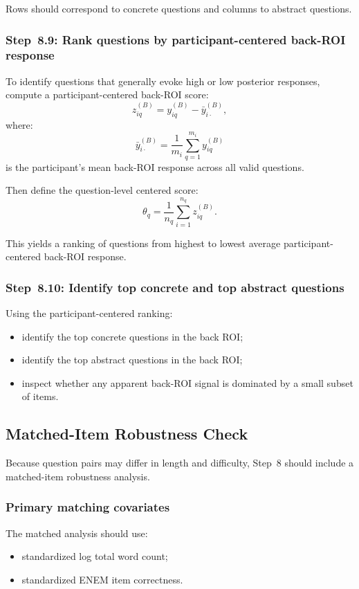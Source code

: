 Rows should correspond to concrete questions and columns to abstract questions.

\subsubsection{Step~8.9: Rank questions by participant-centered back-ROI response}
To identify questions that generally evoke high or low posterior responses,
compute a participant-centered back-ROI score:
\begin{equation}
z^{(B)}_{iq}
=
y^{(B)}_{iq}
-
\bar{y}^{(B)}_{i\cdot},
\end{equation}
where:
\begin{equation}
\bar{y}^{(B)}_{i\cdot}
=
\frac{1}{m_i}
\sum_{q=1}^{m_i} y^{(B)}_{iq}
\end{equation}
is the participant's mean back-ROI response across all valid questions.

Then define the question-level centered score:
\begin{equation}
\theta_q
=
\frac{1}{n_q}
\sum_{i=1}^{n_q} z^{(B)}_{iq}.
\end{equation}

This yields a ranking of questions from highest to lowest average participant-centered back-ROI response.

\subsubsection{Step~8.10: Identify top concrete and top abstract questions}
Using the participant-centered ranking:
\begin{itemize}
    \item identify the top concrete questions in the back ROI;
    \item identify the top abstract questions in the back ROI;
    \item inspect whether any apparent back-ROI signal is dominated by a small subset of items.
\end{itemize}

\subsection{Matched-Item Robustness Check}
Because question pairs may differ in length and difficulty, Step~8 should include a matched-item robustness analysis.

\subsubsection{Primary matching covariates}
The matched analysis should use:
\begin{itemize}
    \item standardized log total word count;
    \item standardized ENEM item correctness.
\end{itemize}

